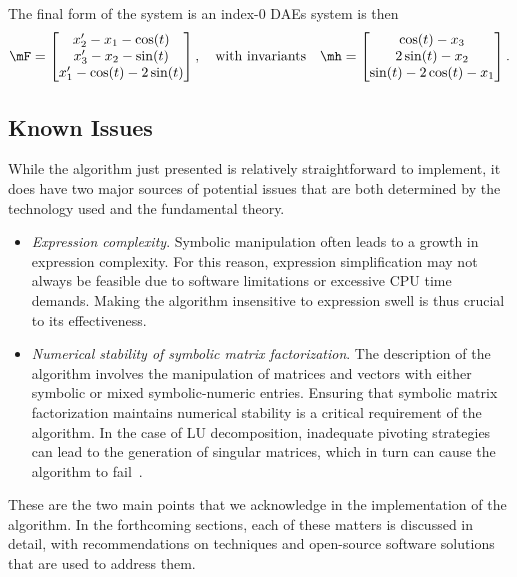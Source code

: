 %
The final form of the system is an index-0 \acp{DAE} system is then
%
\begin{equation}
  \label{chap6:eq:index_3_reduced}
  \mF = \begin{bmatrix}
    x^{\prime}_{2} - x_{1} - \cos(t) \\
    x^{\prime}_{3} - x_{2} - \sin(t) \\
    x^{\prime}_{1} - \cos(t) - 2\sin(t)
  \end{bmatrix},
  \quad \text{with invariants} \quad
  \mh = \begin{bmatrix}
    \cos(t) - x_{3} \\
    2\sin(t) - x_{2} \\
    \sin(t) - 2\cos(t) - x_{1}
  \end{bmatrix}.
\end{equation}
%

\subsection{Known Issues}

While the algorithm just presented is relatively straightforward to implement, it does have two major sources of potential issues that are both determined by the technology used and the fundamental theory.
%
\begin{itemize}
    \item \emph{Expression complexity}. Symbolic manipulation often leads to a growth in expression complexity. For this reason, expression simplification may not always be feasible due to software limitations or excessive CPU time demands. Making the algorithm insensitive to expression swell is thus crucial to its effectiveness.
    \item \emph{Numerical stability of symbolic matrix factorization}. The description of the algorithm involves the manipulation of matrices and vectors with either symbolic or mixed symbolic-numeric entries. Ensuring that symbolic matrix factorization maintains numerical stability is a critical requirement of the algorithm. In the case of \ac{LU} decomposition, inadequate pivoting strategies can lead to the generation of singular matrices, which in turn can cause the algorithm to fail~\cite{zhou2005implicit, zhou2007symbolic, giesbrecht2014symbolic}.
\end{itemize}
%
These are the two main points that we acknowledge in the implementation of the algorithm. In the forthcoming sections, each of these matters is discussed in detail, with recommendations on techniques and open-source software solutions that are used to address them.

